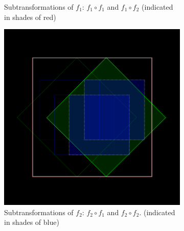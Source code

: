 \documentclass[11pt]{article}
\begin{document}
\begin{enumerate}
\begin{figure}
\begin{subfigure}[b]{0.4\textwidth}
         \caption{Subtransformations of $f_1$: $f_1 \circ f_1$ and $f_1 \circ f_2$ (indicated in shades of red)}
         \label{figure:dragon_curve_b}
         \vspace*{5mm}
     \end{subfigure}
     \hfill
     \begin{subfigure}[b]{0.4\textwidth}
         \centering
         \includegraphics[width=\textwidth]{figures/dragon_curve_c}
         \caption{Subtransformations of $f_2$: $f_2 \circ f_1$ and $f_2 \circ f_2$. (indicated in shades of blue)}
         \label{figure:dragon_curve_c}
         \vspace*{5mm}
     \end{subfigure}
     \hfill
     \begin{subfigure}[b]{0.4\textwidth}
         \centering

\end{subfigure}
\end{figure}
\end{enumerate}
\end{document}
